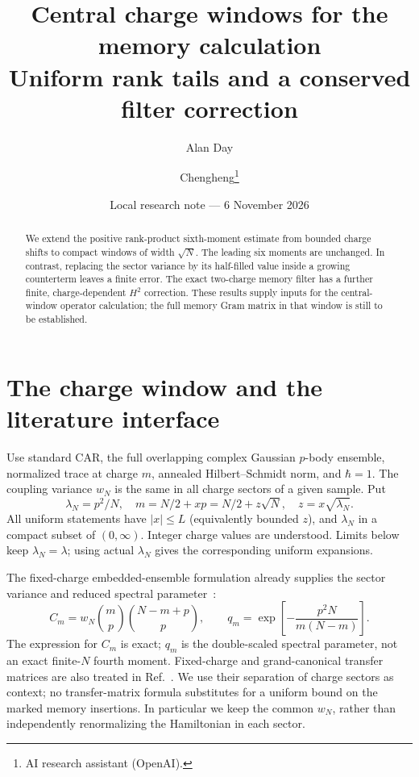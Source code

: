 \documentclass[11pt,a4paper]{article}
\title{Central charge windows for the memory calculation\\Uniform rank tails and a conserved filter correction}
\author{Alan Day \and Chengheng\thanks{AI research assistant (OpenAI).}}
\date{Local research note --- 6 November 2026}
\begin{document}
\maketitle
\begin{abstract}
We extend the positive rank-product sixth-moment estimate from bounded
charge shifts to compact windows of width $\sqrt N$. The leading six
moments are unchanged. In contrast, replacing the sector variance by
its half-filled value inside a growing counterterm leaves a finite
error. The exact two-charge memory filter has a further finite,
charge-dependent $H^2$ correction. These results supply inputs for the
central-window operator calculation; the full memory Gram matrix in
that window is still to be established.
\end{abstract}
\section{The charge window and the literature interface}
Use standard CAR, the full overlapping complex Gaussian $p$-body
ensemble, normalized trace at charge $m$, annealed Hilbert--Schmidt
norm, and $\hbar=1$. The coupling variance $w_N$ is the same in all
charge sectors of a given sample. Put
\begin{equation}
 \lambda_N=p^2/N,\quad m=N/2+xp=N/2+z\sqrt N,
 \quad z=x\sqrt{\lambda_N}.
\end{equation}
All uniform statements have $|x|\le L$ (equivalently bounded $z$),
and $\lambda_N$ in a compact subset of $(0,\infty)$. Integer charge
values are understood. Limits below keep $\lambda_N=\lambda$;
using actual $\lambda_N$ gives the corresponding uniform expansions.

The fixed-charge embedded-ensemble formulation already supplies
the sector variance and reduced spectral parameter~\cite{TT}:
\begin{equation}
 C_m=w_N\binom mp\binom{N-m+p}p,\qquad
 q_m=\exp\!\left[-\frac{p^2N}{m(N-m)}\right].\label{variance}
\end{equation}
The expression for $C_m$ is exact; $q_m$ is the double-scaled
spectral parameter, not an exact finite-$N$ fourth moment.
Fixed-charge and grand-canonical transfer matrices are also treated
in Ref.~\cite{FKN}. We use their separation of charge sectors as
context; no transfer-matrix formula substitutes for a uniform bound
on the marked memory insertions. In particular we keep the common
$w_N$, rather than independently renormalizing the Hamiltonian in
each sector.

\newpage
\end{document}
